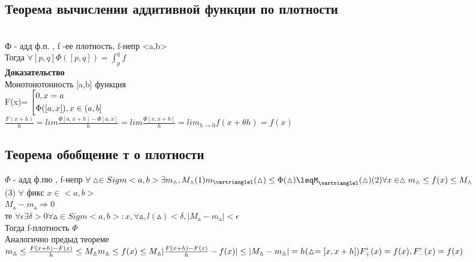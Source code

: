 ﻿\documentclass[12pt, a4paper]{article}
\newcommand{\nl}{\newline}
\begin{document}
     
     \subsection{Теорема вычислении аддитивной функции по  плотности} \\ 
     Ф - адд ф.п. , f -ее плотность, f-непр <a,b>\\
     Тогда  $\forall [p,q] \Phi([p,q])=\int_{p}^{q} f$ \\
     
     \textbf{Доказательство} \\
     Монотонотонность [a,b] функция \\
     F(x)=
     $\left[
     \begin{gathered} 
        0,x=a\hfill 
         \\
        \Phi([a,x]),x \in (a,b]\hfill 
         \\
      \end{gathered} 
    \right.$ \\

$\frac{F(x+h)}{h} = lim\frac{\Phi[a,x+h]-\Phi[a,x]}{h}= lim \frac{\Phi[x,x+h]}{h}=lim_{h\rightarrow 0}f(x+\theta h )=f(x)$ \\

 \subsection{Теорема обобщение т о плотности} 
    $\Phi$ - адд ф.пю , f-непр
   	$ \forall \vartriangle \in Sigm<a,b> \exists m_\vartriangle ,M_\vartriangle \\
    (1)
    m_\vartrianglel(\vartriangle) \leq \Phi(\vartriangle)\leqM_\vartrianglel(\vartriangle)\\
    (2) \forall x \in \vartriangle m_\vartriangle \leq f(x) \leq  M_\vartriangle$\\
    (3) $\forall$ фикс $x \in <a,b>$\\
    $M_\vartriangle-m_\vartriangle \Rightarrow 0$ \\
    те $\forall \epsilon  \exists \delta > 0  \forall \vartriangle \in Sigm<a,b>: x,  \forall \vartriangle, l(\vartriangle) < \delta  ,          |M_\vartriangle - m_\vartriangle|<\epsilon$ \\
     Тогда f-плотность $\Phi$ \\
     \nl
 Аналогично предыд теореме \\
    $m_\vartriangle \leq \frac{F(x+h)-F(x)}{h} \leq M_\vartriangle \\
    m_\vartriangle \leq f(x)\leq M_\vartriangle
    |\frac{F(x+h)-F(x)}{h}-f(x)|\leq |M_\vartriangle-m_\vartriangle| = h (\vartriangle =[x,x+h]) \\
    F_+'(x)=f(x) , F_-'(x)=f(x)$ \\
    
\end{document}
